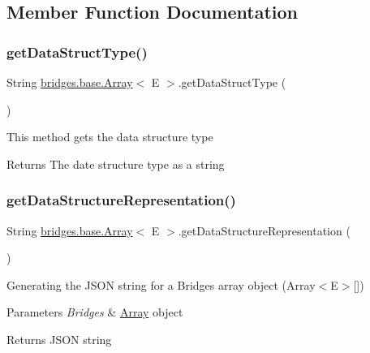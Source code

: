 \subsection{Member Function Documentation}
\mbox{\label{classbridges_1_1base_1_1_array_ad138b9787d46d053d6bd324b344be9a6}} 
\subsubsection{\texorpdfstring{getDataStructType()}{getDataStructType()}}
{\footnotesize\ttfamily String \mbox{\hyperlink{classbridges_1_1base_1_1_array}{bridges.\+base.\+Array}}$<$ E $>$.get\+Data\+Struct\+Type (\begin{DoxyParamCaption}{ }\end{DoxyParamCaption})}

This method gets the data structure type

\begin{DoxyReturn}{Returns}
The date structure type as a string 
\end{DoxyReturn}
\mbox{\label{classbridges_1_1base_1_1_array_a111592e8b75202064bdf06d9c2234d74}} 
\subsubsection{\texorpdfstring{getDataStructureRepresentation()}{getDataStructureRepresentation()}}
{\footnotesize\ttfamily String \mbox{\hyperlink{classbridges_1_1base_1_1_array}{bridges.\+base.\+Array}}$<$ E $>$.get\+Data\+Structure\+Representation (\begin{DoxyParamCaption}{ }\end{DoxyParamCaption})}

Generating the J\+S\+ON string for a Bridges array object (Array$<$\+E$>$\mbox{[}\mbox{]})


\begin{DoxyParams}{Parameters}
{\em Bridges} & \mbox{\hyperlink{classbridges_1_1base_1_1_array}{Array}} object\\
\hline
\end{DoxyParams}
\begin{DoxyReturn}{Returns}
J\+S\+ON string 
\end{DoxyReturn}
\mbox{\label{classbridges_1_1base_1_1_array_af7aa7f3f18989af5f48a2b69cb7fb07d}} 
